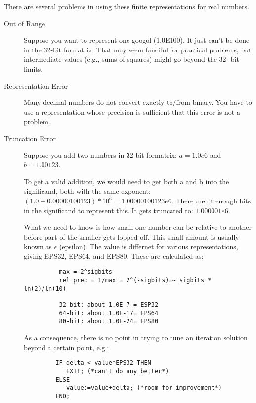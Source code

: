 There are several problems in using these finite
representations for real numbers.
\begin{description}
\item[Out of Range]
     Suppose you want to represent one googol (1.0E100).  It
     just can't be done in the 32-bit formatrix.  That may seem
     fanciful for practical problems, but intermediate
     values (e.g., sums of squares) might go beyond the 32-
     bit limits.

\item[Representation Error]
     Many decimal numbers do not convert exactly to/from
     binary.  You have to use a representation whose
     precision is sufficient that this error is not a
     problem.

\item[Truncation Error]
     Suppose you add two numbers in 32-bit formatrix: $a=1.0e6$ and $b=1.00123$.
     
     To get a valid addition, we would need to get both a
     and b into the significand, both with the same
     exponent: $(1.0+0.00000100123)*10^6 = 1.00000100123e6$.
     There aren't enough bits in the significand to
     represent this.  It gets truncated to: $1.000001e6$.
     
     What we need to know is how small one number can be
     relative to another before part of the smaller gets
     lopped off.  This small amount is usually known as
     $\epsilon$ (epsilon).  The value is differnet for various
     representations, giving EPS32, EPS64, and EPS80.
     These are calculated as:
     \begin{verbatim}
          max = 2^sigbits
          rel prec = 1/max = 2^(-sigbits)=~ sigbits * ln(2)/ln(10)
          
          32-bit: about 1.0E-7 = ESP32
          64-bit: about 1.0E-17= EPS64
          80-bit: about 1.0E-24= EPS80
     \end{verbatim}
     
     As a consequence, there is no point in trying to tune
     an iteration solution beyond a certain point, e.g.:
     \begin{tt} \begin{verbatim}
         IF delta < value*EPS32 THEN
            EXIT; (*can't do any better*)
         ELSE
            value:=value+delta; (*room for improvement*)
         END;
     \end{verbatim} \end{tt}
     

\end{description}
